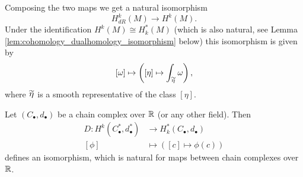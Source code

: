         Composing the two maps we get a natural isomorphism
        \[
        H_{dR}^k(M) \to H^k(M).
        \]
        Under the identification $H^k(M) \cong H_k^\ast(M)$ (which is also natural, see Lemma \ref{lem:cohomology_dualhomology_isomorphism} below) this isomorphism is given by
        \[
        [\omega] \mapsto \left( [\eta] \mapsto \int_{\oset[-1pt]{\sim}{\eta}} \omega \right),
        \]
        where $\oset[-1pt]{\sim}{\eta}$ is a smooth representative of the class $[\eta]$.
        
        \begin{lemma}
            \label{lem:cohomology_dualhomology_isomorphism}
            Let $(C_\bullet,d_\bullet)$ be a chain complex over $\mathbb{R}$ (or any other field). Then 
            \begin{align*}
                D \colon H^k(C_\bullet^\ast,d_\bullet^\ast) &\to H_k^\ast(C_\bullet,d_\bullet) \\
                [\phi] &\mapsto \left( [c] \mapsto \phi(c)\right)
            \end{align*}
            defines an isomorphism, which is natural for maps between chain complexes over $\mathbb{R}$.
        \end{lemma}
